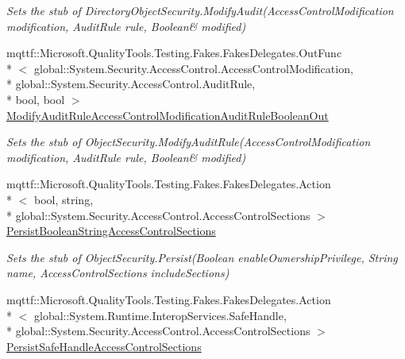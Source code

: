 \begin{DoxyCompactItemize}
\begin{DoxyCompactList}\small\item\em Sets the stub of Directory\-Object\-Security.\-Modify\-Audit(Access\-Control\-Modification modification, Audit\-Rule rule, Boolean\& modified)\end{DoxyCompactList}\item 
mqttf\-::\-Microsoft.\-Quality\-Tools.\-Testing.\-Fakes.\-Fakes\-Delegates.\-Out\-Func\\*
$<$ global\-::\-System.\-Security.\-Access\-Control.\-Access\-Control\-Modification, \\*
global\-::\-System.\-Security.\-Access\-Control.\-Audit\-Rule, \\*
bool, bool $>$ \hyperlink{class_system_1_1_security_1_1_access_control_1_1_fakes_1_1_stub_directory_object_security_a5fda25b93691fc596cfe00522d30bb87}{Modify\-Audit\-Rule\-Access\-Control\-Modification\-Audit\-Rule\-Boolean\-Out}
\begin{DoxyCompactList}\small\item\em Sets the stub of Object\-Security.\-Modify\-Audit\-Rule(Access\-Control\-Modification modification, Audit\-Rule rule, Boolean\& modified)\end{DoxyCompactList}\item 
mqttf\-::\-Microsoft.\-Quality\-Tools.\-Testing.\-Fakes.\-Fakes\-Delegates.\-Action\\*
$<$ bool, string, \\*
global\-::\-System.\-Security.\-Access\-Control.\-Access\-Control\-Sections $>$ \hyperlink{class_system_1_1_security_1_1_access_control_1_1_fakes_1_1_stub_directory_object_security_ac8ace581c4b867d59dac8642b5405698}{Persist\-Boolean\-String\-Access\-Control\-Sections}
\begin{DoxyCompactList}\small\item\em Sets the stub of Object\-Security.\-Persist(\-Boolean enable\-Ownership\-Privilege, String name, Access\-Control\-Sections include\-Sections)\end{DoxyCompactList}\item 
mqttf\-::\-Microsoft.\-Quality\-Tools.\-Testing.\-Fakes.\-Fakes\-Delegates.\-Action\\*
$<$ global\-::\-System.\-Runtime.\-Interop\-Services.\-Safe\-Handle, \\*
global\-::\-System.\-Security.\-Access\-Control.\-Access\-Control\-Sections $>$ \hyperlink{class_system_1_1_security_1_1_access_control_1_1_fakes_1_1_stub_directory_object_security_ab9c6e37c1fbd2f100689ab2eab2d72cc}{Persist\-Safe\-Handle\-Access\-Control\-Sections}

\end{DoxyCompactItemize}
